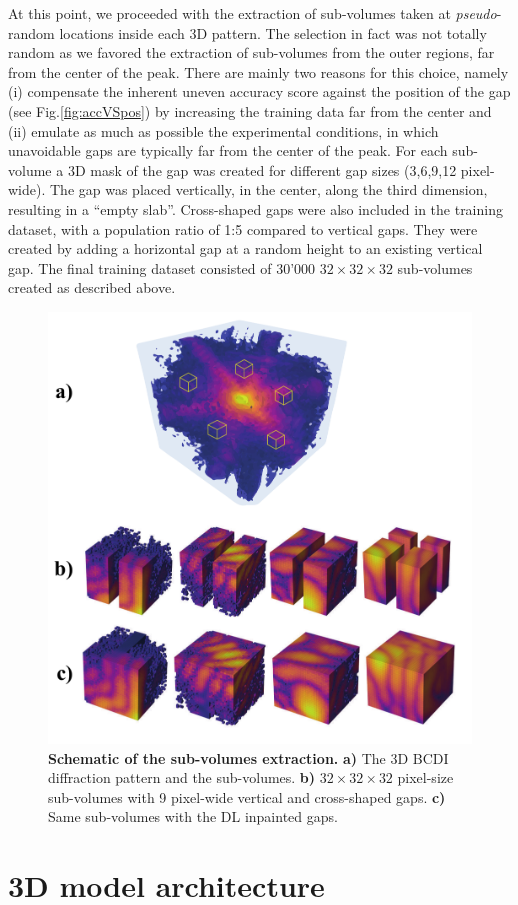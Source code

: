 At this point, we proceeded with the extraction of sub-volumes taken at \textit{pseudo}-random locations inside each 3D pattern. 
The selection in fact was not totally random as we favored the extraction of sub-volumes from the outer regions, far from the 
center of the peak. There are mainly two reasons for this choice, namely (i) compensate the inherent uneven accuracy score against
the position of the gap (see Fig.\ref{fig:accVSpos}) by increasing the training data far from the center and (ii) emulate
as much as possible the experimental conditions, in which unavoidable gaps are typically far from the center of the peak.
For each sub-volume a 3D mask of the gap was created for different gap sizes (3,6,9,12 pixel-wide). The gap was placed 
vertically, in the center, along the third dimension, resulting in a ``empty slab''. Cross-shaped gaps were also 
included in the training dataset, with a population ratio of 1:5 compared to vertical gaps. They were created by 
adding a horizontal gap at a random height to an existing vertical gap.
The final training dataset consisted of 30'000 $32\times32\times32$ sub-volumes created as described above. 

\begin{figure}[h]
    \centering
    \includegraphics[width=.6\textwidth]{figures/Inpainting/process.pdf}
    \caption{\textbf{Schematic of the sub-volumes extraction.} \textbf{a)} The 3D BCDI diffraction pattern and the 
    sub-volumes. \textbf{b)} $32\times32\times32$ pixel-size sub-volumes with 9 pixel-wide vertical and cross-shaped gaps.
    \textbf{c)} Same sub-volumes with the DL inpainted gaps.}
    \label{fig:architecture3d}
\end{figure}

\section{3D model architecture}

